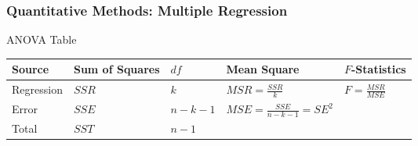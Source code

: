 \subsubsection{Quantitative Methods: Multiple Regression}

ANOVA Table\\
\begin{tabularx}{\textwidth}{X|X|X|p{12em}|X}
\hline
\rowcolor{gray!30}
Source & Sum of Squares & $df$ & Mean Square & $F$-Statistics \\
\hline
Regression & $SSR$ & $k$ & $MSR = \frac{SSR}{k}$ & $F = \frac{MSR}{MSE}$ \\
Error & $SSE$ & $n-k-1$ & $MSE = \frac{SSE}{n-k-1} = SE^2$ & \\
Total & $SST$ & $n-1$ & &\\
\hline
\end{tabularx}

